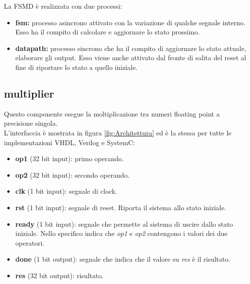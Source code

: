 \documentclass[]{IEEEtran}
\begin{document}
La FSMD è realizzata con due processi:
\begin{itemize}
    \item \textbf{fsm:} processo asincrono attivato con la variazione di qualche segnale interno. Esso ha il compito di calcolare e aggiornare lo stato prossimo.
    \item \textbf{datapath:} processo sincrono che ha il compito di aggiornare lo stato attuale, elaborare gli output. Esso viene anche attivato dal fronte di salita del reset al fine di riportare lo stato a quello iniziale.
\end{itemize}


\subsection{multiplier}
Questo componente esegue la moltiplicazione tra numeri floating point a precisione singola.
\\L'interfaccia è mostrata in figura \ref{fig:Architettura} ed è la stessa per tutte le implementazioni VHDL, Verilog e SystemC: 
\begin{itemize}
    \item \textbf{op1} (32 bit input): primo operando.
    \item \textbf{op2} (32 bit input): secondo operando.
    \item \textbf{clk} (1 bit input): segnale di clock.
    \item \textbf{rst} (1 bit input): segnale di reset. Riporta il sistema allo stato iniziale.
    \item \textbf{ready} (1 bit input): segnale che permette al sistema di uscire dallo stato iniziale. Nello specifico indica che \textit{op1} e \textit{op2} contengono i valori dei due operatori.
    \item \textbf{done} (1 bit output): segnale che indica che il valore su \textit{res} è il risultato.
    \item \textbf{res} (32 bit output): risultato.
\end{itemize}
    
\end{document}
